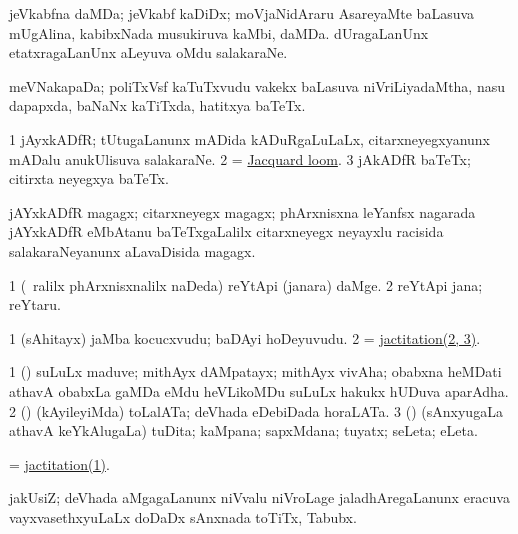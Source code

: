 \bentry
{}
\gl{\nA}
\bmng
jeVkabfna daMDa; jeVkabf kaDiDx; 
\banum
{} moVjaNidAraru AsareyaMte baLasuva mUgAlina, kabibxNada musukiruva kaMbi, daMDa. 
 dUragaLanUnx etatxragaLanUnx aLeyuva oMdu salakaraNe. 
\eanum
\emng
\eentry

\bentry
{}
\gl{\nA}
\bmng
meVNakapaDa; poliTxVsf kaTuTxvudu \mo vakekx baLasuva niVriLiyadaMtha, nasu dapapxda, baNaNx kaTiTxda, hatitxya baTeTx. 
\emng
\eentry

\bentry
{}
\gl{\nA}
\bmng
\bnum
\num{1} jAyxkADfR; tUtugaLanunx mADida kADuRgaLuLaLx, citarxneyegxyanunx mADalu anukUlisuva salakaraNe. 
\num{2}  = \hyperlink{Jacquard loom}{Jacquard loom}. 
\num{3} jAkADfR baTeTx; citirxta neyegxya baTeTx. 
\enum
\emng
\eentry

\bentry
{}
\gl{\nA}
\bmng
jAYxkADfR magagx; citarxneyegx magagx; phArxnisxna leYanfsx nagarada jAYxkADfR  eMbAtanu baTeTxgaLalilx citarxneyegx neyayxlu racisida salakaraNeyanunx aLavaDisida magagx. 
\emng
\eentry

\bentry
{}
\gl{\nA}
\expl{\F\ }
\bmng
\bnum
\num{1} (\kanmu\ ralilx phArxnisxnalilx naDeda) reYtApi (janara) daMge. 
\num{2} reYtApi jana; reYtaru. 
\enum
\emng
\eentry

\bentry
{}
\gl{\nA}
\bmng
\bnum
\num{1} (sAhitayx) jaMba kocucxvudu; baDAyi hoDeyuvudu. 
\num{2}  = \hyperlink{jactitation(2)}{jactitation(2, 3)}. 
\enum
\emng
\eentry

\bentry
{}
\gl{\nA}
\bmng
\bnum
\num{1} (\nAyxshA) suLuLx maduve; mithAyx dAMpatayx; mithAyx vivAha; obabxna heMDati athavA obabxLa gaMDa eMdu heVLikoMDu suLuLx hakukx hUDuva aparAdha. 
\hypertarget{jactitation(2)}{} 
\num{2} (\veYshA) (kAyileyiMda) toLalATa; deVhada eDebiDada horaLATa. 
\num{3} (\veYshA) (sAnxyugaLa athavA keYkAlugaLa) tuDita; kaMpana; sapxMdana; tuyatx; seLeta; eLeta. 
\enum
\emng

\noindent
\gl{\pagu}
\bmng
{} = \hyperlink{jactitation}{jactitation(1)}. 
\emng
\eentry

\bentry
{}
\gl{\nA}
\bmng
jakUsiZ; deVhada aMgagaLanunx niVvalu niVroLage jaladhAregaLanunx eracuva vayxvasethxyuLaLx doDaDx sAnxnada toTiTx, Tabubx. 
\emng
\eentry



